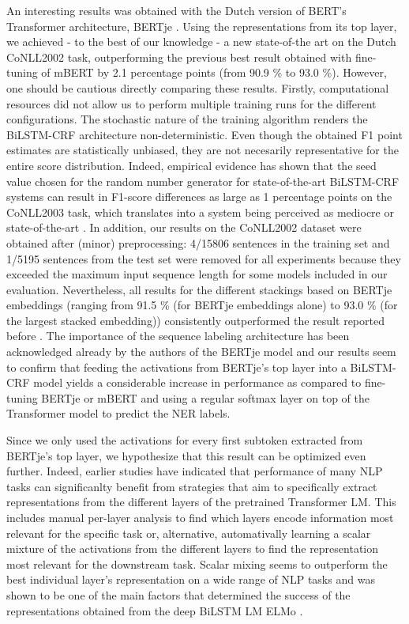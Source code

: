 \documentclass[12pt,a4paper,]{book}
\begin{document}
An interesting results was obtained with the Dutch version of BERT's Transformer architecture, BERTje \citep{devries2019}. Using the representations from its top layer, we achieved - to the best of our knowledge - a new state-of-the art on the Dutch CoNLL2002 task, outperforming the previous best result obtained with fine-tuning of mBERT \citep{wu2019} by 2.1 percentage points (from 90.9 \% to 93.0 \%). However, one should be cautious directly comparing these results. Firstly, computational resources did not allow us to perform multiple training runs for the different configurations. The stochastic nature of the training algorithm renders the BiLSTM-CRF architecture non-deterministic. Even though the obtained F1 point estimates are statistically unbiased, they are not necesarily representative for the entire score distribution. Indeed, empirical evidence has shown that the seed value chosen for the random number generator for state-of-the-art BiLSTM-CRF systems can result in F1-score differences as large as 1 percentage points on the CoNLL2003 task, which translates into a system being perceived as mediocre or state-of-the-art \citep{reimers2017}. In addition, our results on the CoNLL2002 dataset were obtained after (minor) preprocessing: 4/15806 sentences in the training set and 1/5195 sentences from the test set were removed for all experiments because they exceeded the maximum input sequence length for some models included in our evaluation. Nevertheless, all results for the different stackings based on BERTje embeddings (ranging from 91.5 \% (for BERTje embeddings alone) to 93.0 \% (for the largest stacked embedding)) consistently outperformed the result reported before \citep{devries2019, wu2019}. The importance of the sequence labeling architecture has been acknowledged already by the authors of the BERTje model \citep{devries2019} and our results seem to confirm that feeding the activations from BERTje's top layer into a BiLSTM-CRF model yields a considerable increase in performance as compared to fine-tuning BERTje or mBERT and using a regular softmax layer on top of the Transformer model to predict the NER labels.

Since we only used the activations for every first subtoken extracted from BERTje's top layer, we hypothesize that this result can be optimized even further. Indeed, earlier studies have indicated that performance of many NLP tasks can significanlty benefit from strategies that aim to specifically extract representations from the different layers of the pretrained Transformer LM. This includes manual per-layer analysis to find which layers encode information most relevant for the specific task or, alternative, automativally learning a scalar mixture of the activations from the different layers to find the representation most relevant for the downstream task. Scalar mixing seems to outperform the best individual layer's representation on a wide range of NLP tasks \citep{liu2019} and was shown to be one of the main factors that determined the success of the representations obtained from the deep BiLSTM LM ELMo \citep{peters2018}.
\end{document}
